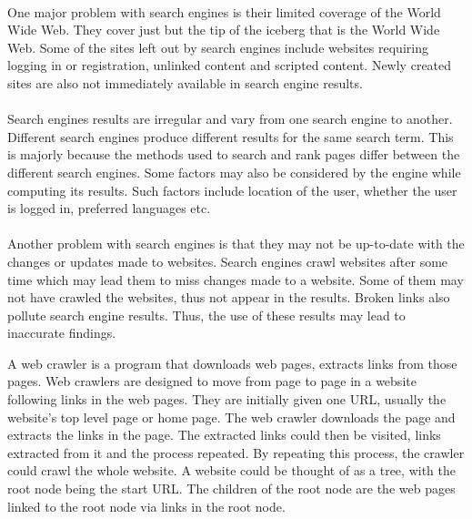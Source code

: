 \paragraph{}
One major problem with search engines is their limited coverage of the World Wide Web. They cover just but the tip of the iceberg that is the World Wide Web. Some of the sites left out by search engines include websites requiring logging in or registration, unlinked  content and scripted content. Newly created sites are also not immediately available in search engine results.
\paragraph{}
Search engines results are irregular and vary from one search engine to another. Different search engines produce different results for the same search term. This is majorly because the methods used to search and rank pages differ between the different search engines. Some factors may also be considered by the engine while computing its results. Such factors include location of the user, whether the user is logged in, preferred languages etc.
\paragraph{}
Another problem with search engines is that they may not be up-to-date with the changes or updates made to websites. Search engines crawl websites after some time which may lead them to miss changes made to a website. Some of them may not have crawled the websites, thus not appear in the results. Broken links also pollute search engine results. Thus, the use of these results may lead to inaccurate findings.

A web crawler is a program that downloads web pages, extracts links from those pages. Web crawlers are designed to move from page to page in a website following links in the web pages. They are initially given one URL, usually the website’s top level page or home page. The web crawler downloads the page and extracts the links in the page. The extracted links could then be visited, links extracted from it and the process repeated. By repeating this process, the crawler could crawl the whole website.
A website could be thought of as a tree, with the root node being the start URL. The children of the root node are the web pages linked to the root node via links in the root node.

